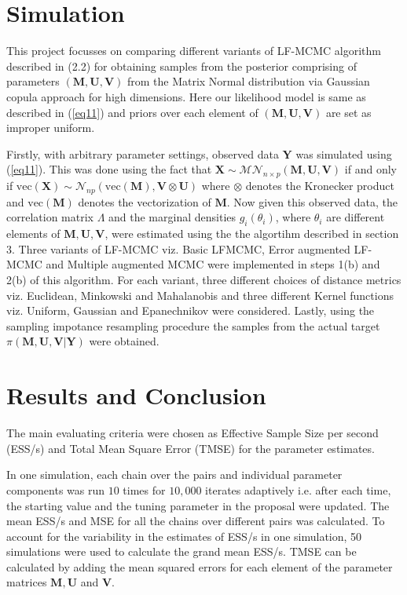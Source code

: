 \begin{multicols}{2}
\section{Simulation}
This project focusses on comparing different variants of LF-MCMC algorithm described in (2.2) for obtaining samples from the posterior comprising of parameters $(\mathbf{M,U,V})$ from the Matrix Normal distribution via Gaussian copula approach for high dimensions. Here our likelihood model is same as described in (\ref{eq11}) and priors over each element of $(\mathbf{M,U,V})$ are set as improper uniform. 

Firstly, with arbitrary parameter settings, observed data $\mathbf{Y}$ was simulated using (\ref{eq11}). This was done using the fact that $\mathbf{X}\sim \mathcal{MN}_{n\times p}(\mathbf{M,U,V})$ if and only if $\mathrm{vec}(\mathbf{X})\sim \mathcal{N}_{np}(\mathrm{vec}(\mathbf{M}),\mathbf{V}\otimes \mathbf{U})$ where $\otimes$  denotes the Kronecker product and $\mathrm {vec} (\mathbf {M} )$ denotes the vectorization of $\mathbf {M}$. Now given this observed data, the correlation matrix $\Lambda$ and the marginal densities $g_i(\theta_i)$, where $\theta_i$ are different elements of $\mathbf {M,U,V}$, were estimated using the the algortihm described in section 3. Three variants of LF-MCMC viz. Basic LFMCMC, Error augmented LF-MCMC and Multiple augmented MCMC were implemented in steps 1(b) and 2(b) of this algorithm. For each variant, three different choices of distance metrics viz. Euclidean, Minkowski and Mahalanobis and three different Kernel functions viz. Uniform, Gaussian and Epanechnikov were considered. Lastly, using the sampling impotance resampling procedure the samples from the actual target $\pi(\mathbf{M,U,V}|\mathbf{Y})$ were obtained. 

\section{Results and Conclusion}
The main evaluating criteria were chosen as Effective Sample Size per second (ESS/s) and Total Mean Square Error (TMSE) for the parameter estimates.

In one simulation, each chain over the pairs and individual parameter components was run $10$ times for $10,000$ iterates adaptively i.e. after each time, the starting value and the tuning parameter in the proposal were updated. The mean ESS/s and MSE for all the chains over different pairs was calculated. To account for the variability in the estimates of ESS/s in one simulation, 50 simulations were used to calculate the grand mean ESS/s. TMSE can be calculated by adding the mean squared errors for each element of the parameter matrices  $\mathbf{M},\mathbf{U}$ and $\mathbf{V}$.


\end{multicols}
